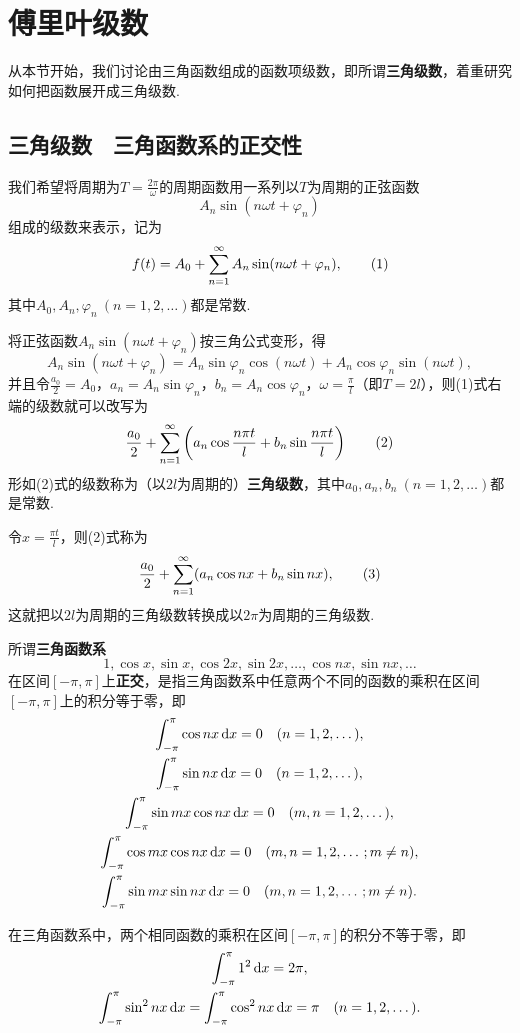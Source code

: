 \section{傅里叶级数}
从本节开始，我们讨论由三角函数组成的函数项级数，即所谓\textbf{三角级数}，着重研究如何把函数展开成三角级数.

\subsection{三角级数　三角函数系的正交性}
我们希望将周期为\(T = \frac{2\pi}{\omega}\)的周期函数用一系列以\(T\)为周期的正弦函数\[
A_n \sin(n \omega t + \varphi_n)
\]组成的级数来表示，记为\begin{gather}
f(t) = A_0 + \sum\limits_{n=1}^{\infty} A_n \sin(n \omega t + \varphi_n), \tag1
\end{gather}其中\(A_0,A_n,\varphi_n\ (n=1,2,\dotsc)\)都是常数.

将正弦函数\(A_n \sin(n \omega t + \varphi_n)\)按三角公式变形，得\[
A_n \sin(n \omega t + \varphi_n)
= A_n \sin\varphi_n \cos(n \omega t) + A_n \cos\varphi_n \sin(n \omega t),
\]并且令\(\frac{a_0}{2} = A_0\)，\(a_n = A_n \sin\varphi_n\)，\(b_n = A_n \cos\varphi_n\)，\(\omega = \frac{\pi}{l}\)（即\(T = 2l\)），则(1)式右端的级数就可以改写为\begin{gather}
\frac{a_0}{2} + \sum\limits_{n=1}^{\infty}\left( a_n \cos{\frac{n \pi t}{l}} + b_n \sin{\frac{n \pi t}{l}} \right) \tag2
\end{gather}
形如(2)式的级数称为（以\(2l\)为周期的）\textbf{三角级数}，其中\(a_0,a_n,b_n\ (n=1,2,\dotsc)\)都是常数.

令\(x = \frac{\pi t}{l}\)，则(2)式称为\begin{gather}
\frac{a_0}{2} + \sum\limits_{n=1}^{\infty}( a_n \cos{n x} + b_n \sin{n x} ), \tag3
\end{gather}
这就把以\(2l\)为周期的三角级数转换成以\(2\pi\)为周期的三角级数.

\begin{definition}
所谓\textbf{三角函数系}\[
1, \cos x, \sin x, \cos 2x, \sin 2x, \dotsc, \cos nx, \sin nx, \dotsc
\]在区间\([-\pi,\pi]\)上\textbf{正交}，是指三角函数系中任意两个不同的函数的乘积在区间\([-\pi,\pi]\)上的积分等于零，即
\begin{gather*}
\int_{-\pi}^{\pi} \cos{nx} \dd{x} = 0 \quad (n=1,2,\dotsc), \\
\int_{-\pi}^{\pi} \sin{nx} \dd{x} = 0 \quad (n=1,2,\dotsc), \\
\int_{-\pi}^{\pi} \sin{mx}\cos{nx} \dd{x} = 0 \quad (m,n=1,2,\dotsc), \\
\int_{-\pi}^{\pi} \cos{mx}\cos{nx} \dd{x} = 0 \quad (m,n=1,2,\dotsc; m \neq n), \\
\int_{-\pi}^{\pi} \sin{mx}\sin{nx} \dd{x} = 0 \quad (m,n=1,2,\dotsc; m \neq n).
\end{gather*}

在三角函数系中，两个相同函数的乘积在区间\([-\pi,\pi]\)的积分不等于零，即
\begin{gather*}
\int_{-\pi}^{\pi} 1^2 \dd{x} = 2\pi, \\
\int_{-\pi}^{\pi} \sin^2 nx \dd{x} = \int_{-\pi}^{\pi} \cos^2 nx \dd{x} = \pi \quad (n=1,2,\dotsc).
\end{gather*}
\end{definition}

